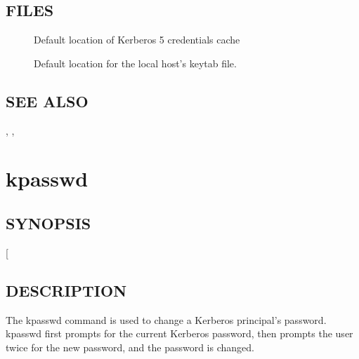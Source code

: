 \documentclass[letterpaper,10pt,english]{sphinxmanual}
\begin{document}
\subsection{FILES}
\label{\detokenize{user/user_commands/klist:files}}\begin{description}
\item[{}] \leavevmode
\sphinxAtStartPar
Default location of Kerberos 5 credentials cache

\item[{}] \leavevmode
\sphinxAtStartPar
Default location for the local host’s keytab file.

\end{description}


\subsection{SEE ALSO}
\label{\detokenize{user/user_commands/klist:see-also}}
\sphinxAtStartPar
{\hyperref[\detokenize{user/user_commands/kinit:kinit-1}]{}}, {\hyperref[\detokenize{user/user_commands/kdestroy:kdestroy-1}]{}}, {\hyperref[\detokenize{user/user_config/kerberos:kerberos-7}]{}}


\section{kpasswd}
\label{\detokenize{user/user_commands/kpasswd:kpasswd}}\label{\detokenize{user/user_commands/kpasswd:kpasswd-1}}\label{\detokenize{user/user_commands/kpasswd::doc}}

\subsection{SYNOPSIS}
\label{\detokenize{user/user_commands/kpasswd:synopsis}}
\sphinxAtStartPar
{} {[}\sphinxstyleemphasis{principal}{]}


\subsection{DESCRIPTION}
\label{\detokenize{user/user_commands/kpasswd:description}}
\sphinxAtStartPar
The kpasswd command is used to change a Kerberos principal’s password.
kpasswd first prompts for the current Kerberos password, then prompts
the user twice for the new password, and the password is changed.
\end{document}
